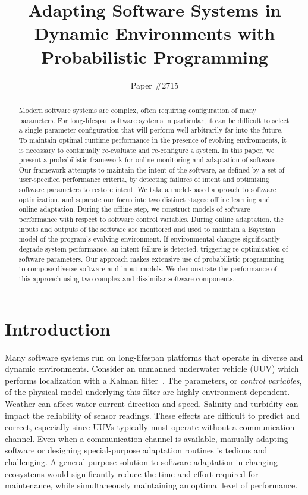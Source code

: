 \documentclass[letterpaper]{article}
\title{Adapting Software Systems in Dynamic Environments with Probabilistic Programming}
\author{Paper \#2715 }
\begin{document}
\maketitle

\begin{abstract}
Modern software systems are complex, often requiring configuration of many parameters.
For long-lifespan software systems in particular, it can be difficult to select a single parameter configuration that will perform well arbitrarily far into the future.
To maintain optimal runtime performance in the presence of evolving environments, it is necessary to continually re-evaluate and re-configure a system.
In this paper, we present a probabilistic framework for online monitoring and adaptation of software.
Our framework attempts to maintain the intent of the software, as defined by a set of user-specified performance criteria, by detecting failures of intent and optimizing software parameters to restore intent.
We take a model-based approach to software optimization, and separate our focus into two distinct stages: offline learning and online adaptation.
During the offline step, we construct models of software performance with respect to software control variables.
During online adaptation, the inputs and outputs of the software are monitored and used to maintain a Bayesian model of the program's evolving environment.
If environmental changes significantly degrade system performance, an intent failure is detected, triggering re-optimization of software parameters.
Our approach makes extensive use of probabilistic programming to compose diverse software and input models.
We demonstrate the performance of this approach using two complex and dissimilar software components.
\end{abstract}

\section{Introduction}

Many software systems run on long-lifespan platforms that operate in diverse and dynamic environments.
Consider an unmanned underwater vehicle (UUV) which performs localization with a Kalman filter~\cite{murphy2012machine}.
The parameters, or \emph{control variables}, of the physical model underlying this filter are highly environment-dependent.
Weather can affect water current direction and speed. Salinity and turbidity can impact the reliability of sensor readings.
These effects are difficult to predict and correct, especially since UUVs typically must operate without a communication channel.
Even when a communication channel is available, manually adapting software or designing special-purpose adaptation routines is tedious and challenging.
A general-purpose solution to software adaptation in changing ecosystems would significantly reduce the time and effort required for maintenance, while simultaneously maintaining an optimal level of performance.
\end{document}

